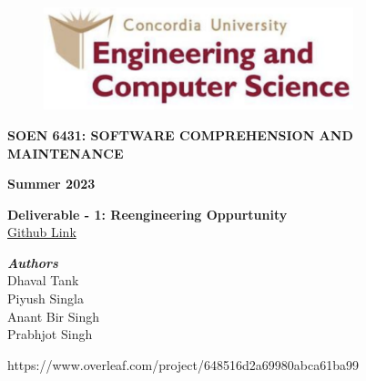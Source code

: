 \documentclass[letterpaper, 11pt]{report}
\begin{document}
\begin{titlepage}
\vspace*{0.7in}
\begin{center}
\begin{figure}[htb]
\begin{center}
\includegraphics[width=9cm]{univ_logo.png}
\end{center}
\end{figure}
\vspace*{0.3in}
\begin{Large}
\textbf{SOEN 6431: SOFTWARE COMPREHENSION AND MAINTENANCE} \\
\end{Large}
\vspace*{0.1in}
\begin{Large}
\textbf{Summer 2023} \\
\end{Large}
\vspace*{0.9in}
\begin{Large}
\textbf{Deliverable - 1: Reengineering Oppurtunity} \\
\href{https://github.com/DHAVAL-TANK/SEON_6431_Deja_VU}{Github Link}\\
\end{Large}
\vspace*{0.75in}
\begin{Large}
\textbf{\emph{Authors}} \\
\vspace*{0.2in}
Dhaval Tank\\
Piyush Singla\\
Anant Bir Singh\\
Prabhjot Singh\\
\end{Large}
\end{center}
\begin{center}
\vspace*{0.9in}
https://www.overleaf.com/project/648516d2a69980abca61ba99\end{center}
\end{titlepage}

\tableofcontents
\newpage
{}
\end{document}
